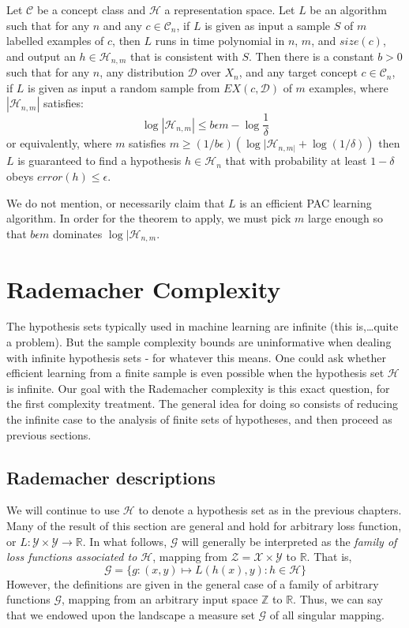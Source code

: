 \begin{theorem}
    Let $\mathcal{C}$ be a concept class and $\mathcal{H}$ a representation space. Let $L$ be an algorithm such that for any $n$ and any $c\in \mathcal{C}_{n}$, if $L$ is given as input a sample $S$ of $m$ labelled examples of $c$, then $L$ runs in time polynomial in $n$, $m$, and $size(c)$, and output an $h\in \mathcal{H}_{n,m}$ that is consistent with $S$. Then there is a constant $b>0$ such that for any $n$, any distribution $\mathcal{D}$ over $X_{n}$, and any target concept $c\in \mathcal{C}_{n}$, if $L$ is given as input a random sample from $EX(c,\mathcal{D})$ of $m$ examples, where $|\mathcal{H}_{n,m}|$ satisfies: 
    \begin{equation}
        \log{|\mathcal{H}_{n,m}|} \leq b \epsilon m - \log{\frac{1}{\delta}}
    \end{equation} 
    or equivalently, where $m$ satisfies $m\geq (1/b\epsilon)(\log{|\mathcal{H}_{n,m|}}+ \log{(1/\delta)})$ then $L$ is guaranteed to find a hypothesis $h\in \mathcal{H}_{n}$ that with probability at least $1-\delta$ obeys $error(h)\leq \epsilon$. 
\end{theorem}
We do not mention, or necessarily claim that $L$ is an efficient PAC learning algorithm. In order for the theorem to apply, we must pick $m$ large enough so that $b\epsilon m$ dominates $\log{|\mathcal{H}_{n,m}}$. 
\section{Rademacher Complexity}
The hypothesis sets typically used in machine learning are infinite (this is,\dots quite a problem). But the sample complexity bounds are uninformative when dealing with infinite hypothesis sets - for whatever this means. One could ask whether efficient learning from a finite sample is even possible when the hypothesis set $\mathcal{H}$ is infinite. Our goal with the Rademacher complexity is this exact question, for the first complexity treatment. The general idea for doing so consists of reducing the infinite case to the analysis of finite sets of hypotheses, and then proceed as previous sections. 
\subsection{Rademacher descriptions}
We will continue to use $\mathcal{H}$ to denote a hypothesis set as in the previous chapters. Many of the result of this section are general and hold for arbitrary loss function, or $L: \mathcal{Y}\times \mathcal{Y}\to \mathbb{R}$. In what follows, $\mathcal{G}$ will generally be interpreted as the \textit{family of loss functions associated to $\mathcal{H}$}, mapping from $\mathcal{Z}=\mathcal{X}\times\mathcal{Y}$ to $\mathbb{R}$. That is, \begin{equation*}
    \mathcal{G} = \{g: (x,y)\mapsto L(h(x),y): h\in \mathcal{H}\}
\end{equation*}
However, the definitions are given in the general case of a family of arbitrary functions $\mathcal{G}$, mapping from an arbitrary input space $\mathbb{Z}$ to $\mathbb{R}$. Thus, we can say that we endowed upon the landscape a measure set $\mathcal{G}$ of all singular mapping. 

